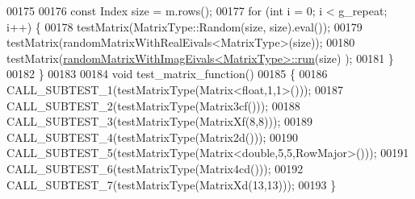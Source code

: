 \begin{DoxyCode}
00175 
00176   \textcolor{keyword}{const} Index size = m.rows();
00177   \textcolor{keywordflow}{for} (\textcolor{keywordtype}{int} i = 0; i < g\_repeat; i++) \{
00178     testMatrix(MatrixType::Random(size, size).eval());
00179     testMatrix(randomMatrixWithRealEivals<MatrixType>(size));
00180     testMatrix(\hyperlink{structrandom_matrix_with_imag_eivals}{randomMatrixWithImagEivals<MatrixType>::run}(size)
      );
00181   \}
00182 \}
00183 
00184 \textcolor{keywordtype}{void} test\_matrix\_function()
00185 \{
00186   CALL\_SUBTEST\_1(testMatrixType(Matrix<float,1,1>()));
00187   CALL\_SUBTEST\_2(testMatrixType(Matrix3cf()));
00188   CALL\_SUBTEST\_3(testMatrixType(MatrixXf(8,8)));
00189   CALL\_SUBTEST\_4(testMatrixType(Matrix2d()));
00190   CALL\_SUBTEST\_5(testMatrixType(Matrix<double,5,5,RowMajor>()));
00191   CALL\_SUBTEST\_6(testMatrixType(Matrix4cd()));
00192   CALL\_SUBTEST\_7(testMatrixType(MatrixXd(13,13)));
00193 \}
\end{DoxyCode}
